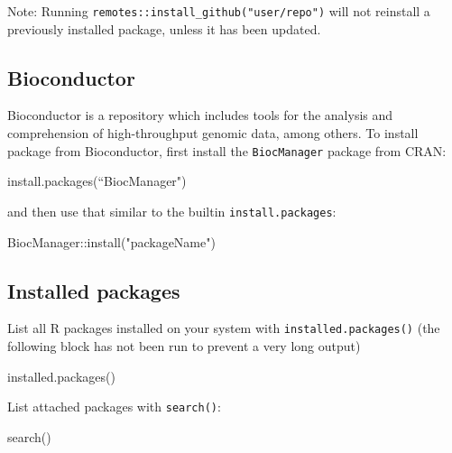 \documentclass[
]{book}
\newenvironment{Shaded}{\begin{snugshade}}{\end{snugshade}}
\newcommand{\FunctionTok}[1]{\textcolor[rgb]{0.00,0.00,0.00}{#1}}
\newcommand{\NormalTok}[1]{#1}
\newcommand{\SpecialCharTok}[1]{\textcolor[rgb]{0.00,0.00,0.00}{#1}}
\newcommand{\StringTok}[1]{\textcolor[rgb]{0.31,0.60,0.02}{#1}}
\begin{document}
Note: Running \texttt{remotes::install\_github("user/repo")} will not reinstall a previously installed package, unless it has been updated.

\hypertarget{bioconductor}{%
\subsection{Bioconductor}\label{bioconductor}}

Bioconductor is a repository which includes tools for the analysis and comprehension of high-throughput genomic data, among others. To install package from Bioconductor, first install the \texttt{BiocManager} package from CRAN:

\begin{Shaded}
\begin{Highlighting}[]
\FunctionTok{install.packages}\NormalTok{(“BiocManager}\StringTok{")}
\end{Highlighting}
\end{Shaded}

and then use that similar to the builtin \texttt{install.packages}:

\begin{Shaded}
\begin{Highlighting}[]
\NormalTok{BiocManager}\SpecialCharTok{::}\FunctionTok{install}\NormalTok{(}\StringTok{"packageName"}\NormalTok{)}
\end{Highlighting}
\end{Shaded}

\hypertarget{installed-packages}{%
\subsection{Installed packages}\label{installed-packages}}

List all R packages installed on your system with \texttt{installed.packages()} (the following block has not been run to prevent a very long output)

\begin{Shaded}
\begin{Highlighting}[]
\FunctionTok{installed.packages}\NormalTok{()}
\end{Highlighting}
\end{Shaded}

List attached packages with \texttt{search()}:

\begin{Shaded}
\begin{Highlighting}[]
\FunctionTok{search}\NormalTok{()}
\end{Highlighting}
\end{Shaded}
\end{document}
